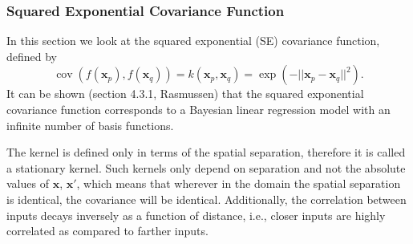 \documentclass[english]{article}
\begin{document}
 \subsubsection{Squared Exponential Covariance Function}
 In this section we look at the squared exponential (SE) covariance function, defined by
 \begin{equation}\label{covariancesquaredexponential}
\operatorname{cov} \left(f(\textbf{x}_p), f(\textbf{x}_q) \right) = k(\textbf{x}_p, \textbf{x}_q) = \exp  \left( - ||\textbf{x}_p - \textbf{x}_q||^2 \right) .
 \end{equation}
 It can be shown (section 4.3.1,  Rasmussen\cite{Rasmussen}) that the squared exponential covariance function corresponds to a Bayesian linear regression model with an infinite number of basis functions.
 
The kernel is defined only in terms of the spatial separation, therefore it is called a stationary kernel. Such kernels only depend on separation and not the absolute values of $\textbf{x}$, $\textbf{x}'$, which means that wherever in the domain the spatial separation is identical, the covariance will be identical. Additionally, the correlation between inputs decays inversely as a function of distance, i.e., closer inputs are highly correlated as compared to farther inputs.
\end{document}
